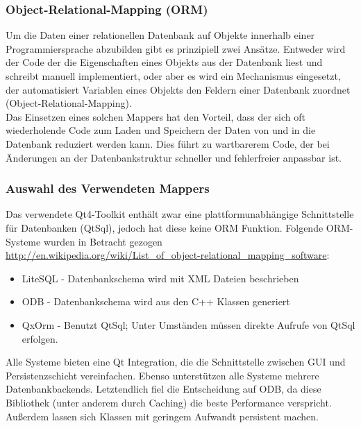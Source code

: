 \subsubsection{Object-Relational-Mapping (ORM)}
Um die Daten einer relationellen Datenbank auf Objekte innerhalb einer Programmiersprache abzubilden gibt es prinzipiell zwei Ansätze.
Entweder wird der Code der die Eigenschaften eines Objekts aus der Datenbank liest und schreibt manuell implementiert, oder aber es wird ein Mechanismus eingesetzt, der automatisiert Variablen eines Objekts den Feldern einer Datenbank zuordnet (Object-Relational-Mapping).\\
Das Einsetzen eines solchen Mappers hat den Vorteil, dass der sich oft wiederholende Code zum Laden und Speichern der Daten von und in die Datenbank reduziert werden kann. Dies führt zu wartbarerem Code, der bei Änderungen an der Datenbankstruktur schneller und fehlerfreier anpassbar ist.

\subsubsection{Auswahl des Verwendeten Mappers}
Das verwendete Qt4-Toolkit enthält zwar eine plattformunabhängige Schnittstelle für Datenbanken (QtSql), jedoch hat diese keine ORM Funktion.
Folgende ORM-Systeme wurden in Betracht gezogen\\
\url{http://en.wikipedia.org/wiki/List_of_object-relational_mapping_software}:
\begin{itemize}
	\item LiteSQL - Datenbankschema wird mit XML Dateien beschrieben
	\item ODB - Datenbankschema wird aus den C++ Klassen generiert
	\item QxOrm - Benutzt QtSql; Unter Umständen müssen direkte Aufrufe von QtSql erfolgen. \cite{QxOrm_Tutorial}
\end{itemize}
Alle Systeme bieten eine Qt Integration, die die Schnittstelle zwischen GUI und Persistenzschicht vereinfachen.
Ebenso unterstützen alle Systeme mehrere Datenbankbackends.
Letztendlich fiel die Entscheidung auf ODB, da diese Bibliothek (unter anderem durch Caching) die beste Performance verspricht.
Außerdem lassen sich Klassen mit geringem Aufwandt persistent machen.

\newpage


